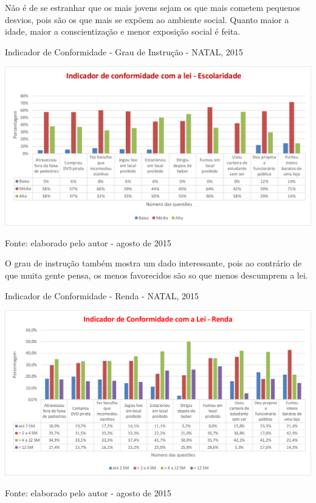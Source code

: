 \documentclass[
	12pt,				%
	openright,			%
	twoside,			%
	a4paper,			%
	chapter=TITLE,		%
	section=TITLE,		%
	subsection=TITLE,	%
	subsubsection=TITLE,%
	spanish,            %
	english,			%
	brazil				%
	]{abntex2}
\begin{document}
\FloatBarrier
\par
Não é de se estranhar que os mais jovens sejam os que mais cometem pequenos desvios, pois são os que mais se expõem ao ambiente social. Quanto maior a idade, maior a conscientização e menor exposição social é feita.
\begin{grafico}[!htpb]
	\caption{Indicador de Conformidade - Grau de Instrução - NATAL, 2015}
	\begin{center}
		\includegraphics[scale=0.5]{Conformidade-escolaridade.png}
	\end{center}
	\ABNTEXchapterfont\small{Fonte: elaborado pelo autor - agosto de 2015}
	\label{Conf_escola}
\end{grafico}
\FloatBarrier
\par
O grau de instrução também mostra um dado interessante, pois ao contrário de que muita gente pensa, os menos favorecidos são so que menos descumprem a lei.
\begin{grafico}[!htpb]
	\caption{Indicador de Conformidade - Renda - NATAL, 2015}
	\begin{center}
		\includegraphics[scale=0.5]{Conformidade-renda.png}
	\end{center}
	\ABNTEXchapterfont\small{Fonte: elaborado pelo autor - agosto de 2015}
	\label{Conf_renda}
\end{grafico}
\end{document}
